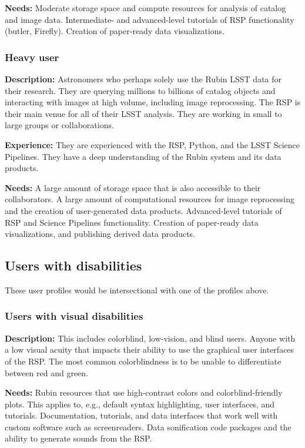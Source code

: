 \textbf{Needs:}
Moderate storage space and compute resources for analysis of catalog and image data.
Intermediate- and advanced-level tutorials of RSP functionality (butler, Firefly).
Creation of paper-ready data visualizations.

\subsubsection{Heavy user}

\textbf{Description:} 
Astronomers who perhaps solely use the Rubin LSST data for their research.
They are querying millions to billions of catalog objects and interacting
with images at high volume, including image reprocessing.
The RSP is their main venue for all of their LSST analysis.
They are working in small to large groups or collaborations.

\textbf{Experience:} 
They are experienced with the RSP, Python, and the LSST Science Pipelines.
They have a deep understanding of the Rubin system and its data products.

\textbf{Needs:}
A large amount of storage space that is also accessible to their collaborators.
A large amount of computational resources for image reprocessing and the
creation of user-generated data products.
Advanced-level tutorials of RSP and Science Pipelines functionality.
Creation of paper-ready data visualizations, and publishing derived data products.

\subsection{Users with disabilities}

These user profiles would be intersectional with one of the profiles above.

\subsubsection{Users with visual disabilities}

\textbf{Description:}
This includes colorblind, low-vision, and blind users.
Anyone with a low visual acuity that impacts their ability to use the 
graphical user interfaces of the RSP.
The most common colorblindness is to be unable to differentiate between red and green.

\textbf{Needs:}
Rubin resources that use high-contrast colors and colorblind-friendly plots.
This applies to, e.g., default syntax highlighting, user interfaces, and tutorials.
Documentation, tutorials, and data interfaces that work well with custom software such
as screenreaders.
Data sonification code packages and the ability to generate sounds from the RSP.

